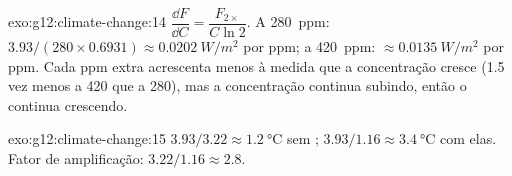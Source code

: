 \begin{solution}{exo:g12:climate-change:14}
$\dfrac{\dd F}{\dd C} = \dfrac{F_{2\times}}{C \ln 2}$. A \qty{280}{ppm}:
$3.93/(280 \times 0.6931) \approx \qty{0.0202}{W/m^2}$ por ppm; a
\qty{420}{ppm}: $\approx \qty{0.0135}{W/m^2}$ por ppm. Cada ppm extra
acrescenta menos  à medida que a concentração cresce (1.5 vez
menos a 420 que a 280), mas a concentração continua subindo, então o
 continua crescendo.
\end{solution}

\begin{solution}{exo:g12:climate-change:15}
$3.93/3.22 \approx \qty{1.2}{\degreeCelsius}$ sem ;
$3.93/1.16 \approx \qty{3.4}{\degreeCelsius}$ com elas. Fator de
amplificação: $3.22/1.16 \approx 2.8$.
\end{solution}

